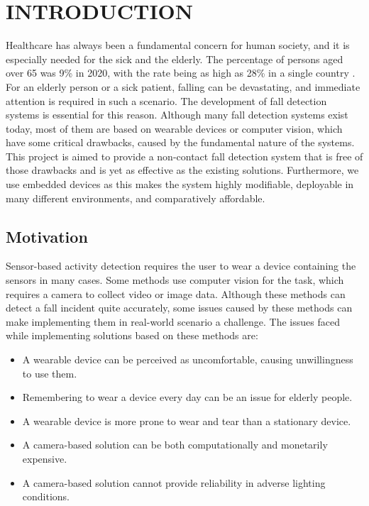 \chapter{INTRODUCTION}
 \label{Chapter 1}
\label{intro}

Healthcare has always been a fundamental concern for human society, and it is especially needed for the sick and the elderly. The percentage of persons aged over 65 was 9\% in 2020, with the rate being as high as 28\% in a single country \cite{WB:2020}. For an elderly person or a sick patient, falling can be devastating, and immediate attention is required in such a scenario. The development of fall detection systems is essential for this reason. Although many fall detection systems exist today, most of them are based on wearable devices or computer vision, which have some critical drawbacks, caused by the fundamental nature of the systems. This project is aimed to provide a non-contact fall detection system that is free of those drawbacks and is yet as effective as the existing solutions. Furthermore, we use embedded devices as this makes the system highly modifiable, deployable in many different environments, and comparatively affordable. 


\section{Motivation}

Sensor-based activity detection requires the user to wear a device containing the sensors in many cases\cite{7841080}. Some methods use computer vision for the task, which requires a camera to collect video or image data\cite{visionFall}. Although these methods can detect a fall incident quite accurately, some issues caused by these methods can make implementing them in real-world scenario a challenge. The issues faced while implementing solutions based on these methods are: 


\begin{itemize}
\item A wearable device can be perceived as uncomfortable, causing unwillingness to use them.
\item Remembering to wear a device every day can be an issue for elderly people.
\item A wearable device is more prone to wear and tear than a stationary device.
\item A camera-based solution can be both computationally and monetarily expensive.
\item A camera-based solution cannot provide reliability in adverse lighting conditions.
\end{itemize}

